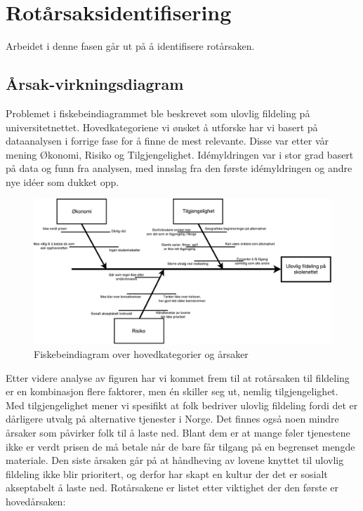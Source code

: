 \section{Rotårsaksidentifisering}
Arbeidet i denne fasen går ut på å identifisere rotårsaken.

\subsection{Årsak-virkningsdiagram}
Problemet i fiskebeindiagrammet ble beskrevet som ulovlig fildeling på universitetnettet. Hovedkategoriene vi ønsket å utforske har vi basert på dataanalysen i forrige fase for å finne de mest relevante. Disse var etter vår mening Økonomi, Risiko og Tilgjengelighet. Idémyldringen var i stor grad basert på data og funn fra analysen, med innslag fra den første idémyldringen og andre nye idéer som dukket opp.

\begin{figure}[H]
    \centering
    \includegraphics[scale=0.5]{case_1/bilder/fiskebein.pdf}
    \caption[Fiskebeindiagram over hovedkategorier og årsaker]{Fiskebeindiagram over hovedkategorier og årsaker}
    \label{fig:case1-fiskebein}
\end{figure}

Etter videre analyse av figuren har vi kommet frem til at rotårsaken til fildeling er en kombinasjon flere faktorer, men én skiller seg ut, nemlig tilgjengelighet. Med tilgjengelighet mener vi spesifikt at folk bedriver ulovlig fildeling fordi det er dårligere utvalg på alternative tjenester i Norge. Det finnes også noen mindre årsaker som påvirker folk til å laste ned. Blant dem er at mange føler tjenestene ikke er verdt prisen de må betale når de bare får tilgang på en begrenset mengde materiale. Den siste årsaken går på at håndheving av lovene knyttet til ulovlig fildeling ikke blir prioritert, og derfor har skapt en kultur der det er sosialt akseptabelt å laste ned. Rotårsakene er listet etter viktighet der den første er hovedårsaken:

